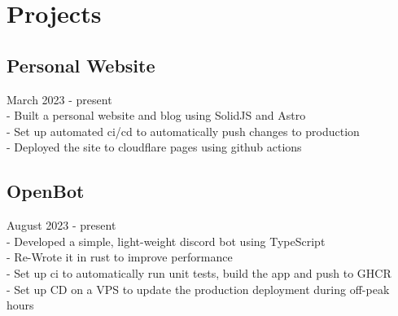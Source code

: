 \section{Projects}

\subsection{Personal Website} March 2023 - present \\
\:-\: Built a personal website and blog using SolidJS and Astro \\
\:-\: Set up automated ci/cd to automatically push changes to production \\
\:-\: Deployed the site to cloudflare pages using github actions \\

\subsection{OpenBot} August 2023 - present \\
\:-\: Developed a simple, light-weight discord bot using TypeScript \\
\:-\: Re-Wrote it in rust to improve performance \\
\:-\: Set up ci to automatically run unit tests, build the app and push to GHCR \\
\:-\: Set up CD on a VPS to update the production deployment during off-peak hours \\
